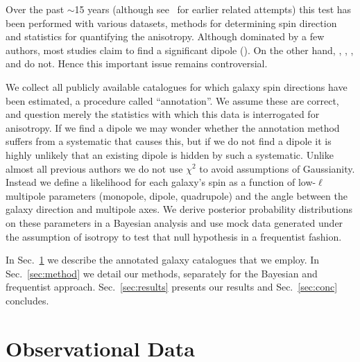 \documentclass[fleqn,usenatbib,nofootinbib]{mnras}
\newcommand{\hd}[1]{{\color{red}\textbf{HD: #1}}}
\newcommand{\red}{\textcolor{red}}
\begin{document}
Over the past $\sim$15 years (although see~\citealt{Dodd,Iye_Sugai,Sugai_Iye} for earlier related attempts) this test has been performed with various datasets, methods for determining spin direction and statistics for quantifying the anisotropy. Although dominated by a few authors, most studies claim to find a significant dipole
(\citealt{Dodd, 2007astro.ph..3694L, Longo, 2017PASA...34...44S, 2020OAst...29...15S, 2020PASA...37...53S, 2020AN....341..324S,2020Ap&SS.365..136S, Shamir_2021, 2021PASA...38...37S, 2022JApA...43...24S, 2022MNRAS.516.2281S, 2022AdAst2022E...5S, McAdam_Shamir_2023_GAN, 2024arXiv240317271S}). On the other hand, \citet{Iye_Sugai}, \citet{Land}, \citet{2017MNRAS.466.3928H}, \citet{Tadaki} and \citet{Iye2021} do not.
Hence this important issue remains controversial.

We collect all publicly available catalogues for which galaxy spin directions have been estimated, a procedure called ``annotation''. We assume these are correct, and question merely the statistics with which this data is interrogated for anisotropy. If we find a dipole we may wonder whether the annotation method suffers from a systematic that causes this, but if we do not find a dipole it is highly unlikely that an existing dipole is hidden by such a systematic. Unlike almost all previous authors we do not use $\chi^2$ to avoid assumptions of Gaussianity.
Instead we define a likelihood for each galaxy's spin as a function of low-$\ell$ multipole parameters (monopole, dipole, quadrupole) and the angle between the galaxy direction and multipole axes. We derive posterior probability distributions on these parameters in a Bayesian analysis and use mock data generated under the assumption of isotropy to test that null hypothesis in a frequentist fashion.

In Sec.~\ref{sec:data} we describe the annotated galaxy catalogues that we employ. In Sec.~\ref{sec:method} we detail our methods, separately for the Bayesian and frequentist approach. Sec.~\ref{sec:results} presents our results and Sec.~\ref{sec:conc} concludes.


\section{Observational Data}
\label{sec:data}
\end{document}
